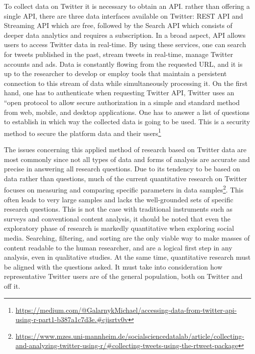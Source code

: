To collect data on Twitter it is necessary to obtain an API. rather than offering a single API, there are three data interfaces available on Twitter: REST API and Streaming API which are free, followed by the Search API which consists of deeper data analytics and requires a subscription. In a broad aspect, API allows users to access Twitter data in real-time. By using these services, one can search for tweets published in the past, stream tweets in real-time, manage Twitter accounts and ads.  Data is constantly flowing from the requested URL, and it is up to the researcher to develop or employ tools that maintain a persistent connection to this stream of data while simultaneously processing it.
On the first hand, one has to authenticate when requesting Twitter API, Twitter uses an “open protocol to allow secure authorization in a simple and standard method from web, mobile, and desktop applications. One has to answer a list of questions to establish in which way the collected data is going to be used. This is a security method to secure the platform data and their users\footnote{\url{https://medium.com/@GalarnykMichael/accessing-data-from-twitter-api-using-r-part1-b387a1c7d3e.\#cjisrtv0v}}

The issues concerning this applied method of research based on Twitter data are most commonly since not all types of data and forms of analysis are accurate and precise in answering all research questions. Due to its tendency to be based on data rather than questions, much of the current quantitative research on Twitter focuses on measuring and comparing specific parameters in data samples\footnote{\href{https://www.mzes.uni-mannheim.de/socialsciencedatalab/article/collecting-and-analyzing-twitter-using-r/\#collecting-tweets-using-the-rtweet-package}{https://www.mzes.uni-mannheim.de/socialsciencedatalab/article/collecting-and-analyzing-twitter-using-r/\#collecting-tweets-using-the-rtweet-package}}. This often leads to very large samples and lacks the well-grounded sets of specific research questions.
This is not the case with traditional instruments such as surveys and conventional content analysis, it should be noted that even the exploratory phase of research is markedly quantitative when exploring social media. Searching, filtering, and sorting are the only viable way to make masses of content readable to the human researcher, and are a logical first step in any analysis, even in qualitative studies. At the same time, quantitative research must be aligned with the questions asked. It must take into consideration how representative Twitter users are of the general population, both on Twitter and off it. 

